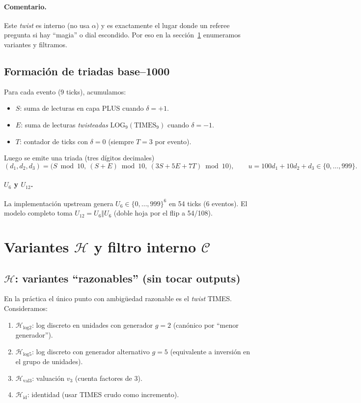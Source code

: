 \documentclass[11pt]{article}
\begin{document}
\paragraph{Comentario.}
Este \emph{twist} es interno (no usa $\alpha$) y es exactamente el lugar donde un referee pregunta si hay ``magia'' o dial escondido. Por eso en la secci\'on~\ref{sec:H_C} enumeramos variantes y filtramos.

\subsection{Formaci\'on de triadas base--1000}
Para cada evento (9 ticks), acumulamos:
\begin{itemize}
  \item $S$: suma de lecturas en capa PLUS cuando $\delta=+1$.
  \item $E$: suma de lecturas \emph{twisteadas} $\mathrm{LOG}_9(\mathrm{TIMES}_9)$ cuando $\delta=-1$.
  \item $T$: contador de ticks con $\delta=0$ (siempre $T=3$ por evento).
\end{itemize}

Luego se emite una triada (tres d\'igitos decimales)
\[
(d_1,d_2,d_3)=\big(S\bmod 10,\ (S+E)\bmod 10,\ (3S+5E+7T)\bmod 10\big),
\qquad u=100d_1+10d_2+d_3\in\{0,\dots,999\}.
\]

\paragraph{$U_6$ y $U_{12}$.}
La implementaci\'on upstream genera $U_6\in\{0,\dots,999\}^6$ en 54 ticks (6 eventos). El modelo completo toma $U_{12}=U_6\Vert U_6$ (doble hoja por el flip a 54/108).

\section{Variantes $\mathcal H$ y filtro interno $\mathcal C$}
\label{sec:H_C}

\subsection{$\mathcal H$: variantes ``razonables'' (sin tocar outputs)}
En la pr\'actica el \'unico punto con ambig\"uedad razonable es el \emph{twist} TIMES. Consideramos:
\begin{enumerate}
  \item $\mathcal H_\mathrm{log2}$: log discreto en unidades con generador $g=2$ (can\'onico por ``menor generador'').
  \item $\mathcal H_\mathrm{log5}$: log discreto con generador alternativo $g=5$ (equivalente a inversi\'on en el grupo de unidades).
  \item $\mathcal H_\mathrm{val3}$: valuaci\'on $v_3$ (cuenta factores de 3).
  \item $\mathcal H_\mathrm{id}$: identidad (usar TIMES crudo como incremento).
\end{enumerate}
\end{document}
